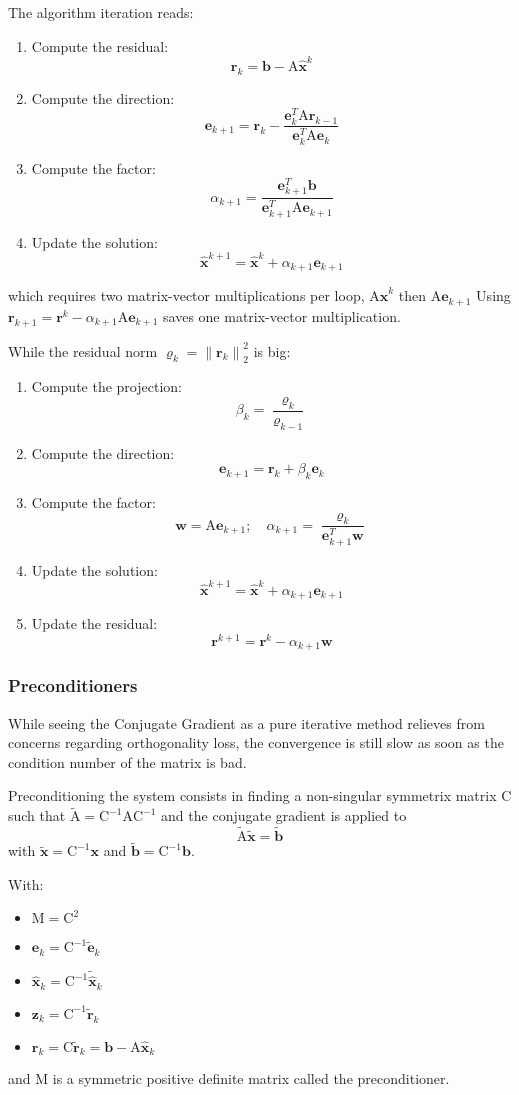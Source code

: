 \documentclass{article}
\newcommand{\bb}{{\boldsymbol b}}
\newcommand{\ee}{{\boldsymbol e}}
\newcommand{\rr}{{\boldsymbol r}}
\newcommand{\xx}{{\boldsymbol x}}
\newcommand{\hx}{\hat{\boldsymbol x}}
\newcommand{\ww}{{\boldsymbol w}}
\newcommand{\zz}{{\boldsymbol z}}
\newcommand{\mA}{{\mathrm A}}
\newcommand{\mC}{{\mathrm C}}
\newcommand{\mM}{{\mathrm M}}
\newcommand{\norm}[1]{{\lVert #1 \rVert}}
\begin{document}
\medskip
The algorithm iteration reads:
\begin{enumerate}
\item Compute the residual:
\[
\rr_k = \bb - \mA \hx^{k}
\]
\item Compute the direction:
\[
\ee_{k+1} = \rr_k - \frac{\ee^T_{k}\mA\rr_{k-1}}{\ee^T_k\mA\ee_k}
\]
\item Compute the factor:
\[
\alpha_{k+1} = \frac{\ee^T_{k+1}\bb}{\ee^T_{k+1}\mA\ee_{k+1}}
\]
\item Update the solution:
\[
\hx^{k+1} = \hx^k + \alpha_{k+1} \ee_{k+1}
\]\end{enumerate}
which requires two matrix-vector multiplications per loop, $\mA\hx^{k}$ then $\mA\ee_{k+1}$
Using $\rr_{k+1} = \rr^k - \alpha_{k+1}\mA\ee_{k+1}$ saves one matrix-vector multiplication.


\medskip
While the residual norm $\varrho_k = \norm{\rr_k}^2_2$ is big:
\begin{enumerate}
\item Compute the projection:
\[
\beta_k = \frac{\varrho_k}{\varrho_{k-1}}
\]
\item Compute the direction:
\[
\ee_{k+1} = \rr_k + \beta_k\ee_k
\]
\item Compute the factor:
\[
\ww = \mA\ee_{k+1};\quad \alpha_{k+1} = \frac{\varrho_k}{\ee^T_{k+1}\ww}
\]
\item Update the solution:
\[
\hx^{k+1} = \hx^k + \alpha_{k+1} \ee_{k+1}
\]
\item Update the residual:
\[
\rr^{k+1} = \rr^k - \alpha_{k+1} \ww
\]
\end{enumerate}

\subsubsection{Preconditioners}

While seeing the Conjugate Gradient as a pure iterative method relieves from concerns regarding orthogonality loss, the convergence is still slow as soon as the condition number of the matrix is bad.

\medskip
Preconditioning the system consists in finding a non-singular symmetrix matrix $\mC$ such that $\tilde \mA = \mC^{-1}\mA\mC^{-1}$ and the conjugate gradient is applied to
\[
\tilde\mA \tilde\xx = \tilde\bb
\]
with $\tilde\xx = \mC^{-1}\xx$ and $\tilde\bb = \mC^{-1}\bb$.

\medskip
With:
\begin{itemize}
\item $\mM = \mC^2$
\item $\ee_k = \mC^{-1}\tilde\ee_k$
\item $\hx_k = \mC^{-1}\tilde\hx_k$
\item $\zz_k = \mC^{-1}\tilde\rr_k$
\item $\rr_k = \mC\tilde\rr_k = \bb - \mA\hx_k$
\end{itemize}
and $\mM$ is a symmetric positive definite matrix called the preconditioner.
\end{document}
